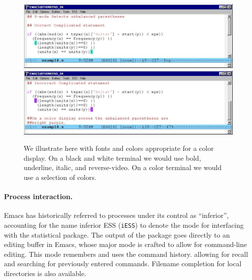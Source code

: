 \documentclass{article}
\newif\ifdraft
\newcommand{\stexttt}[1]{{\small\texttt{#1}}}
\newcommand{\emptyfig}{
\hspace*{42pt}\rule{324pt}{.25pt}\\
\hspace*{42pt}\rule{.25pt}{10pc}
\rule{316pt}{.25pt}
\rule{.25pt}{10pc}}
\begin{document}



\begin{figure}[thbp]
  \centering
  \includegraphics[angle=270,width=\textwidth]{font-cor-s}
  \includegraphics[angle=270,width=\textwidth]{font-incor-s}

  \caption{We illustrate here with fonts and colors appropriate for a
    color display.  On a black and white terminal we would use bold,
    underline, italic, and reverse-video.  On a color terminal we
    would use a selection of colors.}
  \label{f.font}
\end{figure}


\paragraph{Process interaction.}
Emacs has historically referred to processes under its control as
``inferior'', accounting for the name inferior ESS (\stexttt{iESS}) to
denote the mode for interfacing with the statistical package.  The
output of the package goes directly to an editing buffer in Emacs,
whose major mode is crafted to allow for command-line editing.  This
mode remembers and uses the command history.  allowing for recall and
searching for previously entered commands.  Filename completion for
local directories is also available.%
\end{document}
